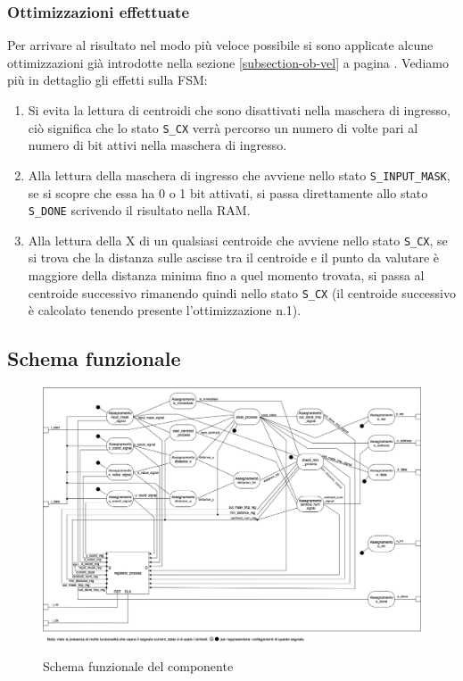 \documentclass{article}
\begin{document}
\subsubsection{Ottimizzazioni effettuate} \label{subsection-ottimiz-fsm}
Per arrivare al risultato nel modo più veloce possibile si sono applicate alcune ottimizzazioni già introdotte nella sezione \ref{subsection-ob-vel} a pagina \pageref{subsection-ob-vel}. Vediamo più in dettaglio gli effetti sulla FSM:
\begin{enumerate}
    \item Si evita la lettura di centroidi che sono disattivati nella maschera di ingresso, ciò significa che lo stato \verb^S_CX^ verrà percorso un numero di volte pari al numero di bit attivi nella maschera di ingresso. 
    \item Alla lettura della maschera di ingresso che avviene nello stato \verb^S_INPUT_MASK^, se si scopre che essa ha 0 o 1 bit attivati, si passa direttamente allo stato \verb^S_DONE^ scrivendo il risultato nella RAM.
    \item Alla lettura della X di un qualsiasi centroide che avviene nello stato \verb^S_CX^, se si trova che la distanza sulle ascisse tra il centroide e il punto da valutare è maggiore della distanza minima fino a quel momento trovata, si passa al centroide successivo rimanendo quindi nello stato \verb^S_CX^ (il centroide successivo è calcolato tenendo presente l'ottimizzazione n.1).
\end{enumerate}

\subsection{Schema funzionale} \label{subsection-schema-funz}
\begin{figure}[H]
    \centering
    \caption{Schema funzionale del componente}
    \includegraphics[width=1.0\textwidth]{images/Schema.png}
    \label{fig:Schema}
\end{figure}
\end{document}
